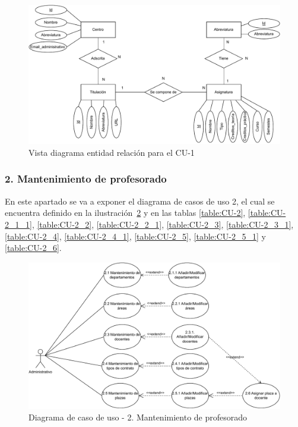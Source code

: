 \begin{figure}[!h]
	\centering
	\includegraphics[scale=0.75]{../img/Anexos/Casos uso/Vistas ER/Diagrama E-R CU 1.pdf}
	\caption{Vista diagrama entidad relación para el CU-1}
	\label{er_cu1}
\end{figure}
\FloatBarrier

\newpage
\subsubsection{2. Mantenimiento de profesorado}

En este apartado se va a exponer el diagrama de casos de uso 2, el cual se encuentra definido en la ilustración~\ref{fig:CU-2} y en las tablas \ref{table:CU-2}, \ref{table:CU-2_1_1}, \ref{table:CU-2_2}, \ref{table:CU-2_2_1}, \ref{table:CU-2_3}, \ref{table:CU-2_3_1}, \ref{table:CU-2_4}, \ref{table:CU-2_4_1}, \ref{table:CU-2_5}, \ref{table:CU-2_5_1} y \ref{table:CU-2_6}.

\begin{figure}[!h]
	\centering
	\includegraphics[scale=0.75]{../img/Anexos/Casos uso/Diagrama casos de uso 3.pdf}
	\caption{Diagrama de caso de uso - 2. Mantenimiento de profesorado}\label{fig:CU-2}
\end{figure}
\FloatBarrier


